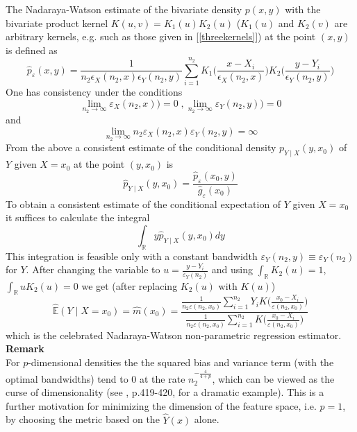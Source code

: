 \documentclass[a4paper,12pt,leqno, titlepage]{article}
\newcommand{\EX}{\mathbb{E}}
\newcommand{\R}{\mathbb{R}}
\begin{document}
\begin{appendix}
The Nadaraya-Watson estimate of the bivariate density $p(x,y)$ with the bivariate product kernel $K(u,v)=K_1(u)K_2(u)$ ($K_1(u)$ and $K_2(v)$ are arbitrary kernels, e.g. such as those given in [\ref{threekernels}]) at the point $(x,y)$ is defined as
\begin{equation}\label{nadarayabivariate}
\hat{p}_{\varepsilon}(x,y)=\frac{1}{n_2\epsilon_{X}(n_2,x)\epsilon_{Y}(n_2,y)}\sum_{i=1}^{n_2}
 K_1\big(\frac{x-X_i}{\epsilon_X(n_2,x)}\big)
 K_2\big(\frac{y-Y_i}{\epsilon_{Y}(n_2,y)}\big)
 \end{equation}
One has consistency under the conditions
$$\lim_{n_2\to\infty}\varepsilon_X(n_2,x))=0 \;, \lim_{n_2\to\infty}\varepsilon_Y(n_2,y))=0$$ and $$\lim_{n_2\to\infty}n_2\varepsilon_X(n_2,x)\varepsilon_Y(n_2,y)=\infty$$
From the above a consistent estimate of the conditional density  $p_{Y\mid X}(y,x_0)$ of $Y$ given $X=x_0$ at the point $(y,x_0)$ is
\begin{equation}\label{conditionaldensityYgivenX}
\hat{p}_{Y\mid X}(y,x_0)=\frac{\hat{p}_{\varepsilon}(x_0,y)}{\hat{g}_{\varepsilon}(x_0)}
\end{equation}
To obtain a consistent estimate of the conditional expectation of $Y$ given $X=x_0$ it suffices to calculate the integral
$$\int_{\R}y\hat{p}_{Y\mid X}(y,x_0)dy$$
This integration is feasible only with a constant bandwidth $\varepsilon_Y(n_2,y)\equiv \varepsilon_Y(n_2)$ for $Y$. After changing the variable to $u=\frac{y-Y_i}{\varepsilon_Y(n_2)}$ and using $\int_{\R}K_2(u)=1$, $\int_{\R}uK_2(u)=0$ we get (after replacing $K_2(u)$ with $K(u)$)
\begin{equation}\label{estcondexpectationofYgivenX}
\hat{\EX}(Y \mid X=x_0)=\hat{m}(x_0)=
\frac{\frac{1}{n_2\varepsilon(n_2,x_0)}\sum^{n_2}_{i=1}Y_iK\big(\frac{x_0-X_i}{\varepsilon(n_2,x_0)}\big)}
{\frac{1}{n_2\varepsilon(n_2,x_0)}\sum^{n_2}_{i=1}K\big(\frac{x_0-X_i}{\varepsilon(n_2,x_0)}\big)}
\end{equation}
which is the celebrated Nadaraya-Watson non-parametric regression estimator.\\
\textbf{Remark}\\
For $p$-dimensional densities the the squared bias and variance term (with the optimal bandwidths) tend to $0$ at the rate $n_2^{-\frac{4}{4+p}}$, which can be viewed as the curse of dimensionality (see \cite{lehmann}, p.419-420, for  a dramatic example). This is a further motivation for minimizing the dimension of the feature space, i.e. $p=1$, by choosing the metric based on the $\hat{Y}(x)$ alone.\\

\end{appendix}
\end{document}
